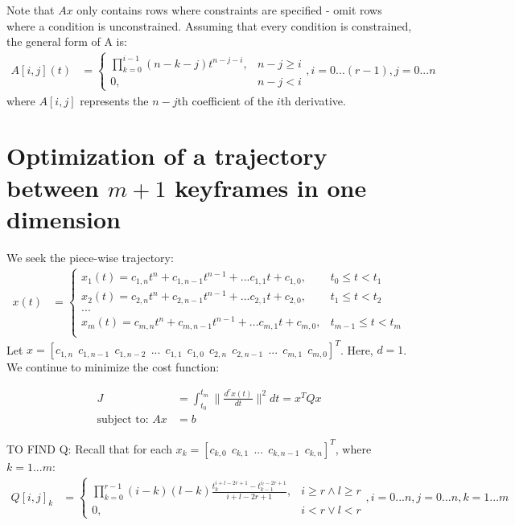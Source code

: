 \documentclass[11pt]{article}
\begin{document}
Note that $Ax$ only contains rows where constraints are specified - omit rows where a condition is unconstrained. Assuming that every condition is constrained, the general form of A is:
\begin{align}
\label{eqn: A} A[i, j] (t) &= 
\begin{cases}
    \prod_{k=0}^{i-1} {(n-k-j)} t^{n-j-i}, & n-j \ge i \\
    0, & n-j < i
\end{cases}, i = 0...(r-1), j = 0...n
\end{align}
where $A[i, j]$ represents the $n-j$th coefficient of the $i$th derivative. 




\newpage
\section{Optimization of a trajectory between $m+1$ keyframes in one dimension} \label{sec: mkeyframes1d}

\mbox{} \newline
We seek the piece-wise trajectory: 
\begin{align*}
x(t) &= 
\begin{cases}
    x_1 (t) = c_{1, n} t^n + c_{1, n-1} t^{n-1} + ... c_{1, 1} t + c_{1, 0}, & t_0 \le t < t_1 \\
    x_2 (t) = c_{2, n} t^n + c_{2, n-1} t^{n-1} + ... c_{2, 1} t + c_{2, 0}, & t_1 \le t < t_2 \\
    ... \\
    x_m (t) = c_{m, n} t^n + c_{m, n-1} t^{n-1} + ... c_{m, 1} t + c_{m, 0}, & t_{m-1} \le t < t_m \\
\end{cases}
\end{align*} 
Let $x = [c_{1, n} \ \ c_{1, n-1} \ \ c_{1, n-2} \ \ ... \ \ c_{1, 1} \ \ c_{1, 0} \ \ c_{2, n} \ \ c_{2, n-1} \ \ ... \ \ c_{m, 1} \ \ c_{m, 0} ]^T$. Here, $d = 1$. We continue to minimize the cost function:

\begin{align*}
J &= \int_{t_0}^{t_m} \|  \frac{d^{r} x(t) }{dt} \|^2 dt = x^T Q x \\
\text{subject to: } Ax &=b
\end{align*}



\mbox{} \newline
\mbox{} \newline
TO FIND Q: \newline
Recall that for each $x_k = [c_{k, 0} \ \ c_{k, 1} \ \ ... \ \ c_{k, n-1} \ \ c_{k, n}]^T$, where $k = 1...m$:
\begin{align*}
Q[i, j]_k &= 
\begin{cases}
    \prod_{k = 0}^{r-1} {(i-k)(l-k)} \frac{ t_{k}^{i+l-2r+1} - t_{k-1}^{i_l-2r+1} }{i+l-2r+1}, & i \ge r \land l \ge r \\
    0, & i < r \lor l < r 
\end{cases}, i = 0...n, j = 0...n, k = 1...m
\end{align*}
\end{document}
